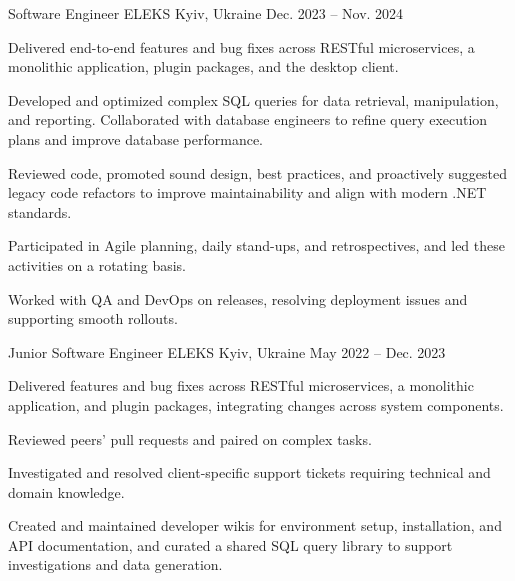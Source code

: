 \begin{cventries}
  \cventry
    {Software Engineer} %
    {ELEKS} %
    {Kyiv, Ukraine} %
    {Dec. 2023 – Nov. 2024} %
    {
      \begin{cvitems} %
        \item {Delivered end-to-end features and bug fixes across RESTful microservices, a monolithic application, plugin packages, and the desktop client.}
        \item {Developed and optimized complex SQL queries for data retrieval, manipulation, and reporting. Collaborated with database engineers to refine query execution plans and improve database performance.}
        \item {Reviewed code, promoted sound design, best practices, and proactively suggested legacy code refactors to improve maintainability and align with modern .NET standards.}
        \item {Participated in Agile planning, daily stand-ups, and retrospectives, and led these activities on a rotating basis.}
        \item {Worked with QA and DevOps on releases, resolving deployment issues and supporting smooth rollouts.}
      \end{cvitems}
    }

  \cventry
    {Junior Software Engineer} %
    {ELEKS} %
    {Kyiv, Ukraine} %
    {May 2022 – Dec. 2023} %
    {
      \begin{cvitems} %
        \item {Delivered features and bug fixes across RESTful microservices, a monolithic application, and plugin packages, integrating changes across system components.}
        \item {Reviewed peers’ pull requests and paired on complex tasks.}
        \item {Investigated and resolved client-specific support tickets requiring technical and domain knowledge.}
        \item {Created and maintained developer wikis for environment setup, installation, and API documentation, and curated a shared SQL query library to support investigations and data generation.}
      \end{cvitems}
    }


\end{cventries}

